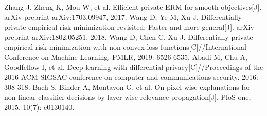 \documentclass[12pt,openany,a4paper,fancyhdr,oneside]{ctexbook}
\begin{document}
\begin{thebibliography}{99}
Zhang J, Zheng K, Mou W, et al. Efficient private ERM for smooth objectives[J]. arXiv preprint arXiv:1703.09947, 2017.
Wang D, Ye M, Xu J. Differentially private empirical risk minimization revisited: Faster and more general[J]. arXiv preprint arXiv:1802.05251, 2018.
Wang D, Chen C, Xu J. Differentially private empirical risk minimization with non-convex loss functions[C]//International Conference on Machine Learning. PMLR, 2019: 6526-6535.
Abadi M, Chu A, Goodfellow I, et al. Deep learning with differential privacy[C]//Proceedings of the 2016 ACM SIGSAC conference on computer and communications security. 2016: 308-318.
Bach S, Binder A, Montavon G, et al. On pixel-wise explanations for non-linear classifier decisions by layer-wise relevance propagation[J]. PloS one, 2015, 10(7): e0130140.

\end{thebibliography}


\pagestyle{plain}
\clearpage
{}
{}


\pagestyle{plain}
\clearpage
{}
{}



\printindex
\end{document}
